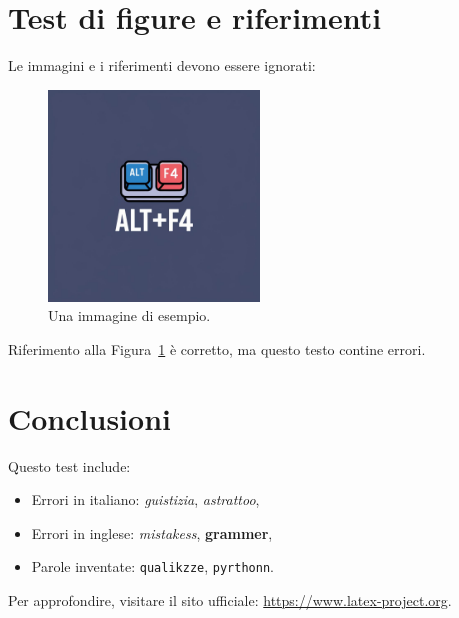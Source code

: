 \documentclass[11pt]{article}
\begin{document}
\section{Test di figure e riferimenti}
Le immagini e i riferimenti devono essere ignorati:
\begin{figure}[h]
    \centering
    \includegraphics[width=0.5\textwidth]{Immagini/logo.jpeg}
    \caption{Una immagine di esempio.}
    \label{fig:example}
\end{figure}

Riferimento alla Figura~\ref{fig:example} è corretto, ma questo testo contine errori.

\section{Conclusioni}
Questo test include:
\begin{itemize}
    \item Errori in italiano: \emph{guistizia}, \textit{astrattoo},
    \item Errori in inglese: \emph{mistakess}, \textbf{grammer},
    \item Parole inventate: \texttt{qualikzze}, \texttt{pyrthonn}.
\end{itemize}

Per approfondire, visitare il sito ufficiale: \url{https://www.latex-project.org}.
\end{document}
